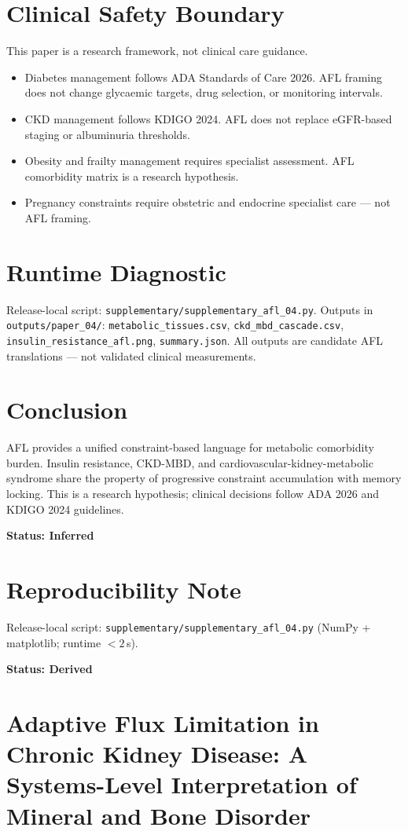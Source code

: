 \documentclass[12pt,a4paper]{article}
\begin{document}
\section{Clinical Safety Boundary}

This paper is a research framework, not clinical care guidance.
\begin{itemize}
    \item Diabetes management follows ADA Standards of Care 2026. AFL framing does not change glycaemic targets, drug selection, or monitoring intervals.
    \item CKD management follows KDIGO 2024. AFL does not replace eGFR-based staging or albuminuria thresholds.
    \item Obesity and frailty management requires specialist assessment. AFL comorbidity matrix is a research hypothesis.
    \item Pregnancy constraints require obstetric and endocrine specialist care — not AFL framing.
\end{itemize}

\section{Runtime Diagnostic}

Release-local script: \texttt{supplementary/supplementary\_afl\_04.py}. Outputs in \texttt{outputs/paper\_04/}: \texttt{metabolic\_tissues.csv}, \texttt{ckd\_mbd\_cascade.csv}, \texttt{insulin\_resistance\_afl.png}, \texttt{summary.json}. All outputs are candidate AFL translations — not validated clinical measurements.

\section{Conclusion}

AFL provides a unified constraint-based language for metabolic comorbidity burden. Insulin resistance, CKD-MBD, and cardiovascular-kidney-metabolic syndrome share the property of progressive constraint accumulation with memory locking. This is a research hypothesis; clinical decisions follow ADA 2026 and KDIGO 2024 guidelines.

\textbf{Status: Inferred}

\section{Reproducibility Note}

Release-local script: \texttt{supplementary/supplementary\_afl\_04.py} (NumPy + matplotlib; runtime $< 2$\,s).

\textbf{Status: Derived}
\clearpage
\section*{Adaptive Flux Limitation in Chronic Kidney Disease: A Systems-Level Interpretation of Mineral and Bone Disorder}




\end{document}
